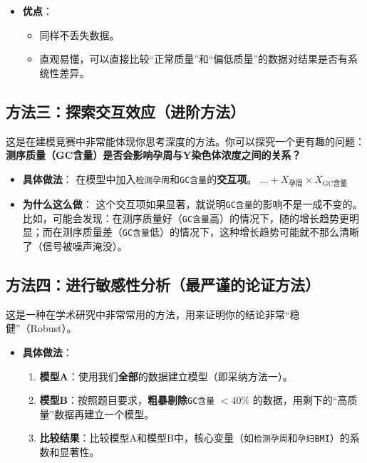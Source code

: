 \documentclass[a4paper, oneside, 12pt]{article}
\begin{document}
\begin{aireport}
{\begin{itemize}
        \item \textbf{优点}：
            \begin{itemize}
                \item 同样不丢失数据。
                \item 直观易懂，可以直接比较“正常质量”和“偏低质量”的数据对结果是否有系统性差异。
            \end{itemize}
    \end{itemize}

    \subsection*{方法三：探索交互效应（进阶方法）}

    这是在建模竞赛中非常能体现你思考深度的方法。你可以探究一个更有趣的问题：\textbf{测序质量（GC含量）是否会影响孕周与Y染色体浓度之间的关系？}

    \begin{itemize}
        \item \textbf{具体做法}：
            在模型中加入\texttt{检测孕周}和\texttt{GC含量}的\textbf{交互项}。
            $... + X_{\text{孕周}} \times X_{\text{GC含量}}$
        
        \item \textbf{为什么这么做}：
            这个交互项如果显著，就说明\texttt{GC含量}的影响不是一成不变的。比如，可能会发现：在测序质量好（\texttt{GC含量}高）的情况下，随的增长趋势更明显；而在测序质量差（\texttt{GC含量}低）的情况下，这种增长趋势可能就不那么清晰了（信号被噪声淹没）。
    \end{itemize}

    \subsection*{方法四：进行敏感性分析（最严谨的论证方法）}

    这是一种在学术研究中非常常用的方法，用来证明你的结论非常“稳健”（Robust）。

    \begin{itemize}
        \item \textbf{具体做法}：
            \begin{enumerate}
                \item \textbf{模型A}：使用我们\textbf{全部}的数据建立模型（即采纳方法一）。
                \item \textbf{模型B}：按照题目要求，\textbf{粗暴剔除}\texttt{GC含量} $< 40\%$ 的数据，用剩下的“高质量”数据再建立一个模型。
                \item \textbf{比较结果}：比较模型A和模型B中，核心变量（如\texttt{检测孕周}和\texttt{孕妇BMI}）的系数和显著性。
            \end{enumerate}
        

\end{itemize}}
\end{aireport}
\end{document}
